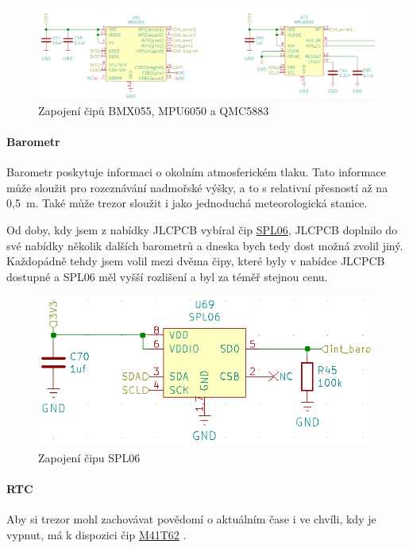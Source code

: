 \begin{figure}[htbp]
    \centering
    \includegraphics[width=\textwidth]{kapitoly/obrazky/E4/vnimani/BMX-MPU.png}
    \caption{Zapojení čipů BMX055, MPU6050 a QMC5883}
    \label{fig:E4-9axis}
\end{figure}

\paragraph{Barometr}
Barometr poskytuje informaci o okolním atmosferickém tlaku. Tato informace může sloužit pro rozeznávání nadmořské výšky, a to s relativní přesností až na 0,5~m. Také může trezor sloužit 
i jako jednoduchá meteorologická stanice.

Od doby, kdy jsem z nabídky JLCPCB vybíral čip \href{https://datasheet.lcsc.com/szlcsc/1907081118_Goertek-SPL06-007_C233787.pdf}{SPL06}, 
JLCPCB doplnilo do své nabídky několik dalších barometrů a dneska bych tedy dost možná zvolil jiný. Každopádně tehdy jsem volil 
mezi dvěma čipy, které byly v nabídce JLCPCB dostupné a SPL06 měl vyšší rozlišení a byl za téměř stejnou cenu.

\begin{figure}[htbp]
    \centering
    \includegraphics[width=\textwidth]{kapitoly/obrazky/E4/vnimani/SPL06.png}
    \caption{Zapojení čipu SPL06}
    \label{fig:E4-SPL06}
\end{figure}

\paragraph{RTC}
Aby si trezor mohl zachovávat povědomí o aktuálním čase i ve chvíli, kdy je vypnut, má k dispozici čip 
\href{https://datasheet.lcsc.com/szlcsc/STMicroelectronics-M41T62Q6F_C113207.pdf}{M41T62} \parencite{m41t62}.


